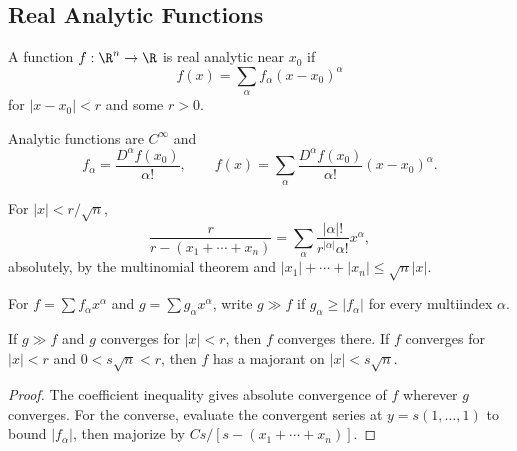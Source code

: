 \subsection{Real Analytic Functions}
\label{sec:real-analytic-functions}

\begin{definition}
\label{def:real-analytic-function}
A function $f:\R^n\to\R$ is real analytic near $x_0$ if
\[
f(x)=\sum_\alpha f_\alpha(x-x_0)^\alpha
\]
for $|x-x_0|<r$ and some $r>0$.
\end{definition}

\begin{remark}
\label{rem:real-analytic-function-remarks}
Analytic functions are $C^\infty$ and
\[
f_\alpha=\frac{D^\alpha f(x_0)}{\alpha!},\qquad
f(x)=\sum_\alpha\frac{D^\alpha f(x_0)}{\alpha!}(x-x_0)^\alpha.
\]
\end{remark}

\begin{example}
\label{ex:real-analytic-example-rational-function}
For $|x|<r/\sqrt n$,
\[
\frac r{r-(x_1+\cdots+x_n)}
=\sum_\alpha\frac{|\alpha|!}{r^{|\alpha|}\alpha!}x^\alpha,
\]
absolutely, by the multinomial theorem and
$|x_1|+\cdots+|x_n|\le\sqrt n|x|$.
\end{example}

\begin{definition}[Majorizes]
\label{def:power-series-majorizes}
For $f=\sum f_\alpha x^\alpha$ and $g=\sum g_\alpha x^\alpha$, write
$g\gg f$ if $g_\alpha\ge|f_\alpha|$ for every multiindex $\alpha$.
\end{definition}

\begin{lemma}[Majorants]
\label{lem:power-series-majorants}
If $g\gg f$ and $g$ converges for $|x|<r$, then $f$ converges there. If $f$
converges for $|x|<r$ and $0<s\sqrt n<r$, then $f$ has a majorant on
$|x|<s\sqrt n$.
\end{lemma}

\begin{proof}
\sketch The coefficient inequality gives absolute convergence of $f$ wherever
$g$ converges. For the converse, evaluate the convergent series at
$y=s(1,\ldots,1)$ to bound $|f_\alpha|$, then majorize by
$Cs/[s-(x_1+\cdots+x_n)]$.
\end{proof}

